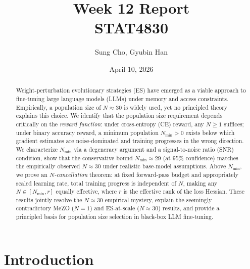 \documentclass[11pt]{article}
\title{\textbf{Week 12 Report}\\[0.5em]
\large STAT4830}
\author{Sung Cho, Gyubin Han}
\date{April 10, 2026}
\theoremstyle{definition}
\theoremstyle{remark}
\newcommand{\Nmin}{N_{\mathrm{min}}}
\begin{document}
\maketitle

\begin{abstract}
Weight-perturbation evolutionary strategies (ES) have emerged as a viable approach to fine-tuning large language models (LLMs) under memory and access constraints. Empirically, a population size of $N \approx 30$ is widely used, yet no principled theory explains this choice. We identify that the population size requirement depends critically on the \emph{reward function}: under cross-entropy (CE) reward, any $N \geq 1$ suffices; under binary accuracy reward, a minimum population $\Nmin > 0$ exists below which gradient estimates are noise-dominated and training progresses in the wrong direction. We characterize $\Nmin$ via a degeneracy argument and a signal-to-noise ratio (SNR) condition, show that the conservative bound $\Nmin \approx 29$ (at 95\% confidence) matches the empirically observed $N \approx 30$ under realistic base-model assumptions. Above $\Nmin$, we prove an \emph{$N$-cancellation} theorem: at fixed forward-pass budget and appropriately scaled learning rate, total training progress is independent of $N$, making any $N \in [\Nmin, r]$ equally effective, where $r$ is the effective rank of the loss Hessian. These results jointly resolve the $N \approx 30$ empirical mystery, explain the seemingly contradictory MeZO ($N=1$) and ES-at-scale ($N \approx 30$) results, and provide a principled basis for population size selection in black-box LLM fine-tuning.
\end{abstract}

\section{Introduction}
\end{document}
